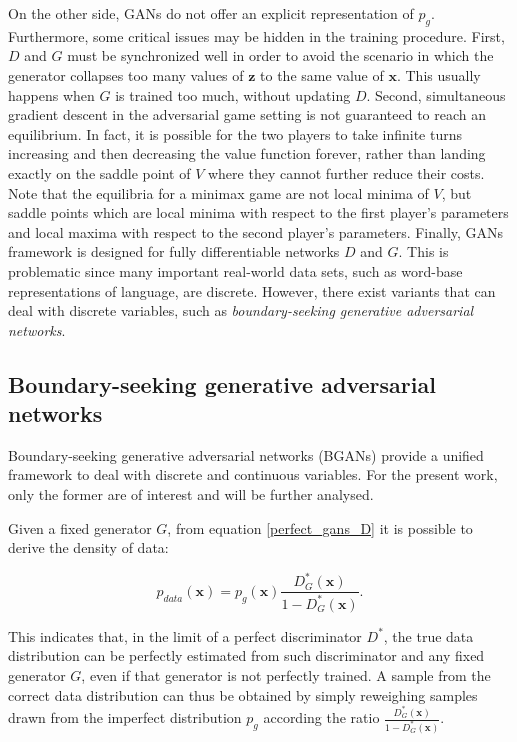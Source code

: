 On the other side, GANs do not offer an explicit representation of $p_g$. Furthermore, some critical issues may be hidden in the training procedure. First, $D$ and $G$ must be synchronized well in order to avoid the scenario in which the generator collapses too many values of $\bm{z}$ to the same value of $\bm{x}$. This usually happens when $G$ is trained too much, without updating $D$. Second, simultaneous gradient descent in the adversarial game setting is not guaranteed to reach an equilibrium. In fact, it is possible for the two players to take infinite turns increasing and then decreasing the value function forever, rather than landing exactly on the saddle point of $V$ where they cannot further reduce their costs. Note that the equilibria for a minimax game are not local minima of $V$, but saddle points which are local minima with respect to the first player’s parameters and local maxima with respect to the second player’s parameters. Finally, GANs framework is designed for fully differentiable networks $D$ and $G$. This is problematic since many important real-world data sets, such as word-base representations of language, are discrete. However, there exist variants that can deal with discrete variables, such as \textit{boundary-seeking generative adversarial networks}.



\subsection{Boundary-seeking generative adversarial networks}

Boundary-seeking generative adversarial networks (BGANs) provide a unified framework to deal with discrete and continuous variables. For the present work, only the former are of interest and will be further analysed.

Given a fixed generator $G$, from equation \eqref{perfect_gans_D} it is possible to derive the density of data:

\begin{equation}
p_{data}(\bm{x}) = p_g(\bm{x}) \frac{D^*_G(\bm{x})}{1 - D^*_G(\bm{x})}.
\end{equation}

This indicates that, in the limit of a perfect discriminator $D^*$, the true data distribution can be perfectly estimated from such discriminator and any fixed generator $G$, even if that generator is not perfectly trained. A sample from the correct data distribution can thus be obtained by simply reweighing samples drawn from the imperfect distribution $p_g$ according the ratio $\frac{D^*_G(\bm{x})}{1 - D^*_G(\bm{x})}$.

